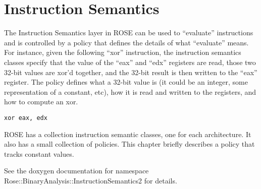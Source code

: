 \chapter{Instruction Semantics}

The Instruction Semantics layer in ROSE can be used to ``evaluate''
instructions and is controlled by a policy that defines the details of
what ``evaluate'' means.  For instance, given the following ``xor''
instruction, the instruction semantics classes specify that the
value of the ``eax'' and ``edx'' registers are read, those two 32-bit
values are xor'd together, and the 32-bit result is then written to
the ``eax'' register. The policy defines what a 32-bit value is (it
could be an integer, some representation of a constant, etc), how it
is read and written to the registers, and how to compute an xor.

\begin{verbatim}
xor eax, edx
\end{verbatim}

ROSE has a collection instruction semantic classes, one for each
architecture. It also has a small collection of policies.  This
chapter briefly describes a policy that tracks constant values.

See the doxygen documentation for namespace
Rose::BinaryAnalysis::InstructionSemantics2 for details.

